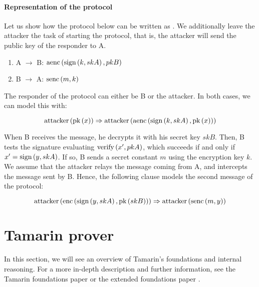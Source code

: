 \paragraph{Representation of the protocol}

Let us show how the protocol below can be written as \Horncs{}. We additionally leave the attacker the task of starting the protocol, that is, the attacker will send the public key of the responder to A.

\begin{enumerate}
    \label{enum:protocol}
    \item A $\rightarrow$ B: $\mbox{aenc}\left(\mbox{sign}\left(k, skA\right), pkB\right)$
    \item B $\rightarrow$ A: $\mbox{senc}\left(m, k\right)$
\end{enumerate}

The responder of the protocol can either be B or the attacker. In both cases, we can model this with:

\begin{equation}
    \mbox{attacker}\left(\mbox{pk}\left(x\right)\right) \Rightarrow \mbox{attacker}\left(\mbox{aenc}\left(\mbox{sign}\left(k, skA\right), \mbox{pk}\left(x\right)\right)\right)
\end{equation}

When B receives the message, he decrypts it with his secret key $skB$. Then, B tests the signature evaluating $\mbox{verify}\left(x', pkA\right)$, which succeeds if and only if $x' = \mbox{sign}\left(y, skA\right)$. If so, B sends a secret constant $m$ using the encryption key $k$. We assume that the attacker relays the message coming from A, and intercepts the message sent by B. Hence, the following clause models the second message of the protocol:

\begin{equation}
    \mbox{attacker}\left(\mbox{enc}\left(\mbox{sign}\left(y, skA\right), \mbox{pk}\left(skB\right)\right)\right) \Rightarrow \mbox{attacker}\left(\mbox{senc}\left(m, y\right)\right)
\end{equation}






\section{Tamarin prover}
\label{sec:tamarin-foundations}
In this section, we will see an overview of Tamarin's foundations and internal reasoning.
For a more in-depth description and further information, see the Tamarin foundations paper \cite{TamarinFoundations} or the extended foundations paper \cite{TamarinFoundationsExtended}.

